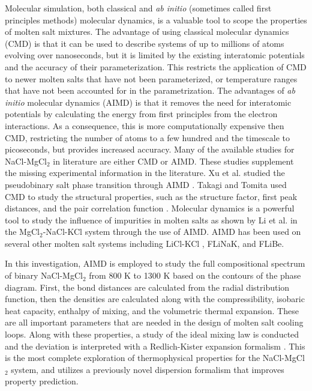 \documentclass[review]{elsarticle}
\begin{document}
Molecular simulation, both classical and \textit{ab initio} (sometimes called first principles methods) molecular dynamics, is a valuable tool to scope the properties of molten salt mixtures. The advantage of using classical molecular dynamics (CMD) is that it can be used to describe systems of up to millions of atoms evolving over nanoseconds, but it is limited by the existing interatomic potentials and the accuracy of their parameterization. This restricts the application of CMD to newer molten salts that have not been parameterized, or temperature ranges that have not been accounted for in the parametrization. The advantages of \textit{ab initio} molecular dynamics (AIMD) is that it removes the need for interatomic potentials by calculating the energy from first principles from the electron interactions. As a consequence, this is more computationally expensive then CMD, restricting the number of atoms to a few hundred and the timescale to picoseconds, but provides increased accuracy. Many of the available studies for NaCl-MgCl$_{2}$ in literature are either CMD or AIMD. These studies supplement the missing experimental information in the literature. Xu et al. studied the pseudobinary salt phase transition through AIMD \cite{XU2020568}. Takagi and Tomita used CMD to study the structural properties, such as the structure factor, first peak distances, and the pair correlation function \cite{takagi1993structure}. Molecular dynamics is a powerful tool to study the influence of impurities in molten salts as shown by Li et al. \cite{li2020insight} in the MgCl$_{2}$-NaCl-KCl system through the use of AIMD. AIMD has been used on several other molten salt systems including LiCl-KCl \cite{Duemmler2021,Bengston2014,Song2017}, FLiNaK\cite{NAM2014148}, and FLiBe\cite{NAM2014148}. 

In this investigation, AIMD is employed to study the full compositional spectrum of binary NaCl-MgCl$_{2}$ from 800 K to 1300 K based on the contours of the phase diagram. First, the bond distances are calculated from the radial distribution function, then the densities are calculated along with the compressibility, isobaric heat capacity, enthalpy of mixing, and the volumetric thermal expansion. These are all important parameters that are needed in the design of molten salt cooling loops. Along with these properties, a study of the ideal mixing law is conducted and the deviation is interpreted with a Redlich-Kister expansion formalism \cite{redlich1948}. This is the most complete exploration of thermophysical properties for the NaCl-MgCl$_2$ system, and utilizes a previously novel dispersion formalism that improves property prediction. 
\end{document}

